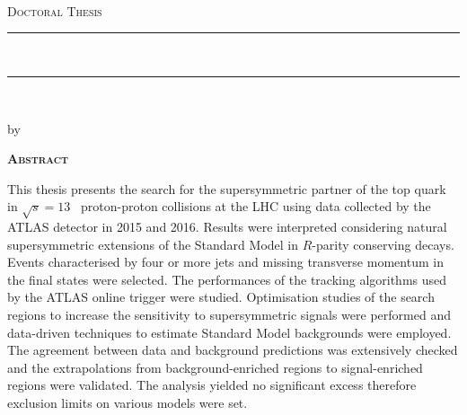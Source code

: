 
\thispagestyle{empty}

\begin{center}

    {\normalsize \href{http://www.sussex.ac.uk/}{\myUni} \\} %
    {\normalsize \myFaculty \\} %
    {\normalsize \myDepartment \\} %
    \bigskip\vspace*{.02\textheight}
    {\Large \textsc{Doctoral Thesis}}\par
    \bigskip
    
    {\rule{\linewidth}{1pt}\\%
    \Large \myTitle \par} %
    \rule{\linewidth}{1pt}\\[0.4cm]
    
    \bigskip
	{\normalsize by \myName \par} %
    \bigskip\vspace*{.06\textheight}
\end{center}

    {\centering\Huge\textsc{\textbf{Abstract}} \par}
    \bigskip



    \noindent This thesis presents the search for the supersymmetric partner of the top quark in $\sqrt{s}=13$ \TeV\ proton-proton collisions at the LHC using data collected by the ATLAS detector in 2015 and 2016. Results were interpreted considering natural supersymmetric extensions of the Standard Model in $R$-parity conserving decays. Events characterised by four or more jets and missing transverse momentum in the final states were selected. The performances of the tracking algorithms used by the ATLAS online trigger were studied. Optimisation studies of the search regions to increase the sensitivity to supersymmetric signals were performed and data-driven techniques to estimate Standard Model backgrounds were employed. The agreement between data and background predictions was extensively checked and the extrapolations from background-enriched regions to signal-enriched regions were validated. The analysis yielded no significant excess therefore exclusion limits on various models were set.


